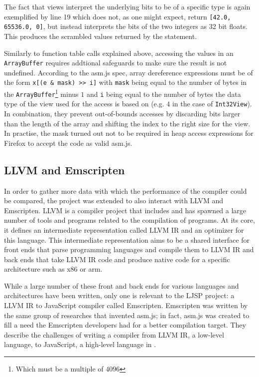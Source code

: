 \documentclass[11pt]{report}
\begin{document}
The fact that views interpret the underlying bits to be of a specific type is again exemplified by line 19 which does not, as one might expect, return \texttt{[42.0, 65536.0, 0]}, but instead interprets the bits of the two integers as 32 bit floats. This produces the scrambled values returned by the statement.

Similarly to function table calls explained above, accessing the values in an \texttt{ArrayBuffer} requires addtional safeguards to make sure the result is not undefined. According to the asm.js spec, array dereference expressions must be of the form \texttt{x[(e \& mask) {>}> i]} with \texttt{mask} being equal to the number of bytes in the \texttt{ArrayBuffer}\footnote{Which must be a multiple of $4096$} minus $1$ and \texttt{i} being equal to the number of bytes the data type of the view used for the access is based on (e.g. $4$ in the case of \texttt{Int32View}). In combination, they prevent out-of-bounds accesses by discarding bits larger than the length of the array and shifting the index to the right size for the view. In practise, the mask turned out not to be required in heap access expressions for Firefox to accept the code as valid asm.js.

\subsection{LLVM and Emscripten}
In order to gather more data with which the performance of the compiler could be compared, the project was extended to also interact with LLVM and Emscripten. LLVM is a compiler project that includes and has spawned a large number of tools and programs related to the compilation of programs. At its core, it defines an intermediate representation called LLVM IR and an optimizer for this language. This intermediate representation aims to be a shared interface for front ends that parse programming languages and compile them to LLVM IR and back ends that take LLVM IR code and produce native code for a specific architecture such as x86 or arm. 

While a large number of these front and back ends for various languages and architectures have been written, only one is relevant to the LJSP project: a LLVM IR to JavaScript compiler called Emscripten. Emscripten was written by the same group of researches that invented asm.js; in fact, asm.js was created to fill a need the Emscripten developers had for a better compilation target. They describe the challenges of writing a compiler from LLVM IR, a low-level language, to JavaScript, a high-level language in \cite{Zakai:2011:ELC:2048147.2048224}.
\end{document}
